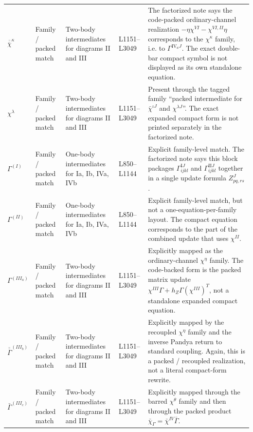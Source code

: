 \documentclass{article}
\begin{document}
\begin{longtable}{p{} p{} p{} p{} p{}}
$\overline{\overline\chi}^{\kappa}$ & Family / packed match & Two-body intermediates for diagrams II and III & L1151--L3049 & The factorized note says the code-packed ordinary-channel realization $-\eta\chi^{VI}-\chi^{VI,II}\eta$ corresponds to the $\chi^{\kappa}$ family, i.e. to $\Gamma^{\mathrm{IV}_aJ}$. The exact double-bar compact symbol is not displayed as its own standalone equation. \\

$\chi^{\lambda}$ & Family / packed match & Two-body intermediates for diagrams II and III & L1151--L3049 & Present through the tagged family ``packed intermediate for $\bar\chi^{\iota J}$ and $\chi^{\lambda J}$''. The exact expanded compact form is not printed separately in the factorized note. \\

$\Gamma^{(I)}$ & Family / packed match & One-body intermediates for Ia, Ib, IVa, IVb & L850--L1144 & Explicit family-level match. The factorized note says this block packages $\Gamma^{\mathrm{I}J}_{ijkl}$ and $\Gamma^{\mathrm{II}J}_{ijkl}$ together in a single update formula $Z^J_{pq,rs}$. \\

$\Gamma^{(II)}$ & Family / packed match & One-body intermediates for Ia, Ib, IVa, IVb & L850--L1144 & Explicit family-level match, but not a one-equation-per-family layout. The compact equation corresponds to the part of the combined update that uses $\chi^{II}$. \\

$\Gamma^{(III_a)}$ & Family / packed match & Two-body intermediates for diagrams II and III & L1151--L3049 & Explicitly mapped as the ordinary-channel $\chi^{\eta}$ family. The code-backed form is the packed matrix update $\chi^{III}\Gamma + h_Z\Gamma(\chi^{III})^T$, not a standalone expanded compact equation. \\

$\overline{\overline\Gamma}^{(III_b)}$ & Family / packed match & Two-body intermediates for diagrams II and III & L1151--L3049 & Explicitly mapped by the recoupled $\chi^{\eta}$ family and the inverse Pandya return to standard coupling. Again, this is a packed / recoupled realization, not a literal compact-form rewrite. \\

$\bar\Gamma^{(III_c)}$ & Family / packed match & Two-body intermediates for diagrams II and III & L1151--L3049 & Explicitly mapped through the barred $\chi^{\theta}$ family and then through the packed product $\bar\chi_\Gamma = \bar\chi^{IV}\bar\Gamma$. \\


\end{longtable}
\end{document}
